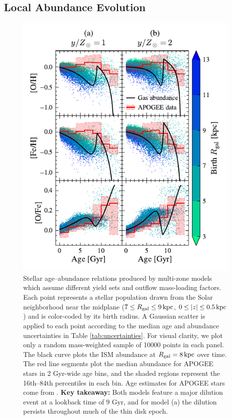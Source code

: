 \documentclass[twocolumn,twocolappendix,linenumbers]{aastex631}
\begin{document}
\subsection{Local Abundance Evolution}
\label{sec:age-abundance}

\begin{figure}
    \centering
    \includegraphics[width=\linewidth]{figures/abundance_evolution_yields.pdf}
    \caption{Stellar age--abundance relations produced by multi-zone models which assume different yield sets and outflow mass-loading factors. Each point represents a stellar population drawn from the Solar neighborhood near the midplane ($7\leq R_{\rm gal}\leq 9\,{\rm kpc}$, $0\leq |z| \leq 0.5\,{\rm kpc}$) and is color-coded by its birth radius. A Gaussian scatter is applied to each point according to the median age and abundance uncertainties in Table \ref{tab:uncertainties}. For visual clarity, we plot only a random mass-weighted sample of \num{10000} points in each panel. The black curve plots the ISM abundance at $R_{\rm gal}=8\,{\rm kpc}$ over time. The red line segments plot the median abundance for APOGEE stars in {2 Gyr}-wide age bins, and the shaded regions represent the 16th--84th percentiles in each bin. Age estimates for APOGEE stars come from \citet{leung_variational_2023}. {\bf Key takeaway:} Both models feature a major dilution event at a lookback time of 9 Gyr, and for model (a) the dilution persists throughout much of the thin disk epoch.}
    \label{fig:abundance-evolution-yields}
\end{figure}
\end{document}
